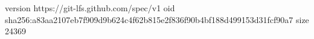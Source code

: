 version https://git-lfs.github.com/spec/v1
oid sha256:a83aa2107eb7f909d9b624c4f62b815e2f836f90b4bf188d499153d31fcf90a7
size 24369
